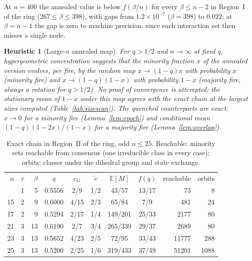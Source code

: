 \documentclass[aps,pre,onecolumn,superscriptaddress,amsmath,amssymb,longbibliography]{revtex4-2}
\newtheorem{heuristic}[theorem]{Heuristic}
\theoremstyle{definition}
\theoremstyle{remark}
\newcommand{\ctil}{\tilde c}
\newcommand{\cG}{c_G}
\newcommand{\E}{\mathbb{E}}
\begin{document}
At $n=400$ the annealed value is below $f(\beta/n)$ for every
$\beta\le n-2$ in Region~I of the ring ($267\le\beta\le398$), with gaps
from $1.2\times10^{-7}$ ($\beta=398$) to $0.022$; at $\beta=n-1$ the gap
is zero to machine precision, since each interaction set then misses a
single node.

\begin{heuristic}[Large-$n$ annealed map]
\label{heur:map}
For $q>1/2$ and $n\to\infty$ at fixed $q$, hypergeometric concentration
suggests that the minority fraction $x$ of the annealed version evolves,
per fire, by the random map $x\to(1-q)x$ with probability $x$ (minority
fire) and $x\to(1-q)(1-x)$ with probability $1-x$ (majority fire, always
a rotation for $q>1/2$). No proof of convergence is attempted; the
stationary mean of $1-x$ under this map agrees with the exact chain at
the largest sizes computed (Table~\ref{tab:sizescan}). The quenched
counterparts are exact: $x\to0$ for a minority fire
(Lemma~\ref{lem:epoch}) and conditional mean $(1-q)(1-2x)/(1-x)$ for a
majority fire (Lemma~\ref{lem:overlap}).
\end{heuristic}

\begin{table}[t]
\caption{Exact chain in Region~II of the ring, odd $n\le25$. Reachable:
minority sets reachable from consensus (one irreducible class in every
case); orbits: classes under the dihedral group and state exchange.}
\label{tab:smexact}
\begin{ruledtabular}
\begin{tabular}{rrrcccccrr}
$n$ & $r$ & $\beta$ & $q$ & $\cG$ & $\ctil$ & $\E[M]$ & $f(q)$ & reachable & orbits\\
\colrule
 9 & 1 &  5 & 0.5556 & 2/9  & 1/2 & 43/57   & 13/17 &    73 &    8\\
15 & 2 &  9 & 0.6000 & 4/15 & 2/3 & 65/84   & 7/9   &   481 &   24\\
17 & 2 &  9 & 0.5294 & 2/17 & 1/4 & 149/201 & 25/33 &  2177 &   80\\
21 & 3 & 13 & 0.6190 & 2/7  & 3/4 & 265/339 & 29/37 &  2689 &   80\\
23 & 3 & 13 & 0.5652 & 4/23 & 2/5 & 72/95   & 33/43 & 11777 &  288\\
25 & 3 & 13 & 0.5200 & 2/25 & 1/6 & 319/433 & 37/49 & 51201 & 1088\\
\end{tabular}
\end{ruledtabular}
\end{table}
\end{document}
